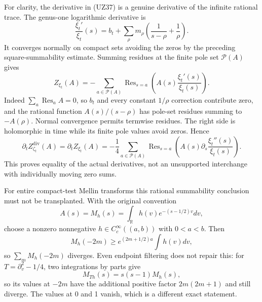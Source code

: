 \documentclass[
  10pt,
  a4paper,
]{article}
\begin{document}
For clarity, the derivative in (UZ37) is a genuine derivative of the
infinite rational trace. The genus-one logarithmic derivative is \[
\frac{\xi_t'}{\xi_t}(s)
=b_t+\sum_\rho m_\rho\left(\frac1{s-\rho}+\frac1\rho\right).
\] It converges normally on compact sets avoiding the zeros by the
preceding square-summability estimate. Summing residues at the finite
pole set \(\mathcal P(A)\) gives \[
Z_{\xi_t}(A)
=-\sum_{a\in\mathcal P(A)}
\operatorname{Res}_{s=a}
\left(A(s)\frac{\xi_t'(s)}{\xi_t(s)}\right).
\tag{UZ38}
\] Indeed \(\sum_a\operatorname{Res}_a A=0\), so \(b_t\) and every
constant \(1/\rho\) correction contribute zero, and the rational
function \(A(s)/(s-\rho)\) has pole-set residues summing to
\(-A(\rho)\). Normal convergence permits termwise residues. The right
side is holomorphic in time while its finite pole values avoid zeros.
Hence \[
\partial_t Z_{\zeta_t}^{\mathrm{div}}(A)
=\partial_t Z_{\xi_t}(A)
=-\frac14\sum_{a\in\mathcal P(A)}
\operatorname{Res}_{s=a}
\left(A(s)\partial_s\frac{\xi_t''(s)}{\xi_t(s)}\right).
\tag{UZ39}
\] This proves equality of the actual derivatives, not an unsupported
interchange with individually moving zero sums.

For entire compact-test Mellin transforms this rational summability
conclusion must not be transplanted. With the original convention \[
A(s)=M_h(s)=\int_{\mathbb R}h(v)e^{-(s-1/2)v}dv,
\tag{UZ40}
\] choose a nonzero nonnegative \(h\in C_c^\infty((a,b))\) with
\(0<a<b\). Then \[
M_h(-2m)\ge e^{(2m+1/2)a}\int h(v)dv,
\tag{UZ41}
\] so \(\sum_mM_h(-2m)\) diverges. Even endpoint filtering does not
repair this: for \(T=\partial_v^2-1/4\), two integrations by parts give
\[
M_{Th}(s)=s(s-1)M_h(s),
\] so its values at \(-2m\) have the additional positive factor
\(2m(2m+1)\) and still diverge. The values at 0 and 1 vanish, which is a
different exact statement.
\end{document}
